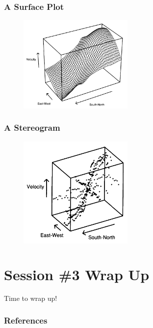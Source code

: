 \documentclass[aspectratio=1610]{beamer}
\begin{document}
\begin{frame}
	\frametitle{A Surface Plot}
	\begin{figure}
		\begin{center}
			\includegraphics[width=0.5\textwidth]{figures/surfaceplot.png}
		\end{center}
	\end{figure}
\end{frame}

\begin{frame}
	\frametitle{A Stereogram}
	\begin{figure}
		\begin{center}
			\includegraphics[width=0.5\textwidth]{figures/stereogram.png}
		\end{center}
	\end{figure}
\end{frame}


\section{Session \#3 Wrap Up}

\begin{frame}{}{}
	\LARGE \centering Time to wrap up!
\end{frame}

\begin{frame}
	\frametitle{References}
	\printbibliography
\end{frame}
\end{document}

